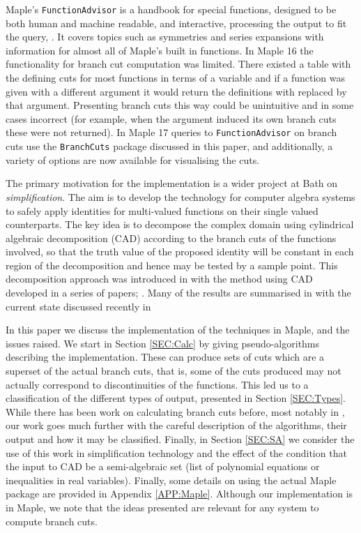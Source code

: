 \documentclass{llncs}
\begin{document}
{\sc Maple}'s \texttt{FunctionAdvisor} is a handbook for special functions, designed to be both human and machine readable, and interactive, processing the output to fit the query, \cite{ChebTerrab2002}.  It covers topics such as symmetries and series expansions with information for almost all of {\sc Maple}'s built in functions.  In {\sc Maple 16} the functionality for branch cut computation was limited.  There existed a table with the defining cuts for most functions in terms of a variable  and if a function was given with a different argument it would return the definitions with  replaced by that argument.  Presenting branch cuts this way could be unintuitive and in some cases incorrect (for example, when the argument induced its own branch cuts these were not returned).  In {\sc Maple 17} queries to \texttt{FunctionAdvisor} on branch cuts use the \texttt{BranchCuts} package discussed in this paper, and additionally, a variety of options are now available for visualising the cuts. 

The primary motivation for the implementation is a wider project at Bath on \textit{simplification}.  The aim is to develop the technology for computer algebra systems  to safely apply identities for multi-valued functions on their single valued counterparts.  The key idea is to decompose the complex domain using cylindrical algebraic decomposition (CAD) according to the branch cuts of the functions involved, so that the truth value of the proposed identity will be constant in each region of the decomposition and hence may be tested by a sample point.  This decomposition approach was introduced in \cite{DF94} with the method using CAD developed in a series of papers;
\cite{BD02, BD03, BBDP04, BPB05, BBDP07, PBD10}. 
Many of the results are summarised in \cite{Phisanbut11} with the current state discussed recently in \cite{DBEW12}

In this paper we discuss the implementation of the techniques in {\sc Maple}, and the issues raised.  We start in Section \ref{SEC:Calc} by giving pseudo-algorithms describing the implementation.  
These can produce sets of cuts which are a superset of the actual branch cuts, that is, some of the cuts produced may not actually correspond to discontinuities of the functions.  This led us to a classification of the different types of output, presented in Section \ref{SEC:Types}.   
While there has been work on calculating branch cuts before, most notably in \cite{DF94}, our work goes much further with the careful description of the algorithms, their output and how it may be classified. 
Finally, in Section \ref{SEC:SA} we consider the use of this work in simplification technology and the effect of the condition that the input to CAD be a semi-algebraic set (list of polynomial equations or inequalities in real variables). Finally, some details on using the actual {\sc Maple} package are provided in Appendix \ref{APP:Maple}.
Although our implementation is in {\sc Maple}, we note that the ideas presented are relevant for any system to compute branch cuts.  
\end{document}
